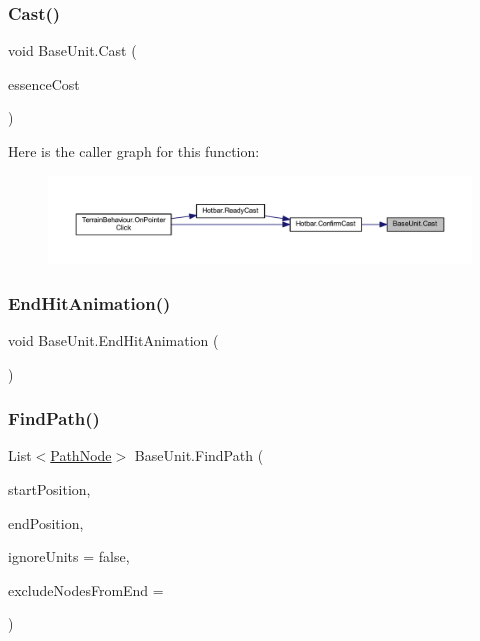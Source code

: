 \subsubsection{\texorpdfstring{Cast()}{Cast()}}
{\footnotesize\ttfamily void Base\+Unit.\+Cast (\begin{DoxyParamCaption}\item[{int}]{essence\+Cost }\end{DoxyParamCaption})}

Here is the caller graph for this function\+:\nopagebreak
\begin{figure}[H]
\begin{center}
\leavevmode
\includegraphics[width=350pt]{class_base_unit_a5fb838313b1a61dbf38d440c2a12667e_icgraph}
\end{center}
\end{figure}
\mbox{\label{class_base_unit_ac451e0e35631687d8a40a20ce68e0e51}} 
\subsubsection{\texorpdfstring{EndHitAnimation()}{EndHitAnimation()}}
{\footnotesize\ttfamily void Base\+Unit.\+End\+Hit\+Animation (\begin{DoxyParamCaption}{ }\end{DoxyParamCaption})}

\mbox{\label{class_base_unit_a7adf93eb6a52235a25e1344e401d05d2}} 
\subsubsection{\texorpdfstring{FindPath()}{FindPath()}}
{\footnotesize\ttfamily List$<$\mbox{\hyperlink{class_path_node}{Path\+Node}}$>$ Base\+Unit.\+Find\+Path (\begin{DoxyParamCaption}\item[{Vector2\+Int}]{start\+Position,  }\item[{Vector2\+Int}]{end\+Position,  }\item[{bool}]{ignore\+Units = {\ttfamily false},  }\item[{int}]{exclude\+Nodes\+From\+End = {} }\end{DoxyParamCaption})}

